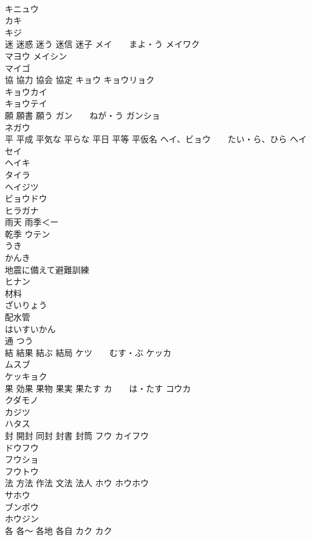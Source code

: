 \documentclass[8pt]{extreport}
\begin{document}
\begin{CJK}{UTF8}{min}
\\	キニュウ
\\	カキ 
\\	キジ 
\\	迷 迷惑 迷う 迷信 迷子	メイ　　まよ・う メイワク 
\\	マヨウ メイシン 
\\	マイゴ 
\\	協 協力 協会 協定	キョウ キョウリョク 
\\	キョウカイ 
\\	キョウテイ 
\\	願 願書 願う	ガン　　ねが・う ガンショ 
\\	ネガウ 
\\	平 平成 平気な 平らな 平日 平等 平仮名	ヘイ、ビョウ　　たい・ら、ひら ヘイセイ 
\\	ヘイキ 
\\	タイラ 
\\	ヘイジツ 
\\	ビョウドウ 
\\	ヒラガナ
\\	雨天 雨季＜ー
\\	乾季	ウテン 
\\	うき 
\\	かんき
\\	地震に備えて避難訓練	
\\	ヒナン
\\	材料	
\\	ざいりょう
\\	配水管	
\\	はいすいかん
\\	通	つう 
\\	結 結果 結ぶ 結局	ケツ　　むす・ぶ ケッカ 
\\	ムスブ 
\\	ケッキョク 
\\	果 効果 果物 果実 果たす	カ　　は・たす コウカ 
\\	クダモノ 
\\	カジツ 
\\	ハタス 
\\	封 開封 同封 封書 封筒	フウ カイフウ 
\\	ドウフウ 
\\	フウショ 
\\	フウトウ 
\\	法 方法 作法 文法 法人	ホウ ホウホウ 
\\	サホウ 
\\	ブンポウ 
\\	ホウジン 
\\	各 各〜 各地 各自	カク カク~ 

\end{CJK}
\end{document}
